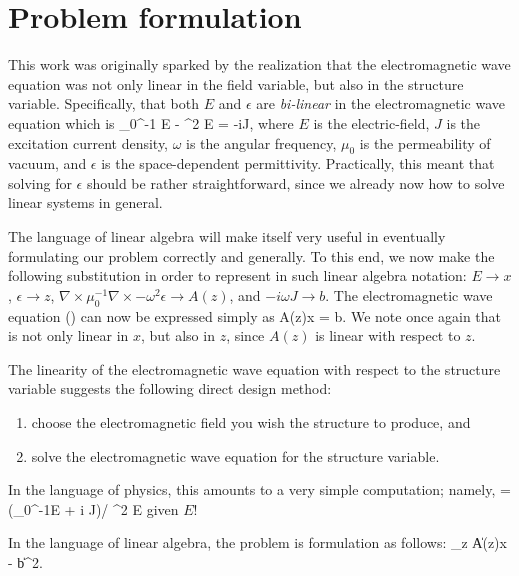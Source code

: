 \section{Problem formulation}
This work was originally sparked by the realization that 
    the electromagnetic wave equation was not only linear in the field variable,
    but also in the structure variable.
Specifically, that both $E$ and $\epsilon$ are \emph{bi-linear} in
    the electromagnetic wave equation which is
    \BE \nabla \times \mu_0^{-1} \nabla \times E - \omega^2 \epsilon E = 
        -i\omega J, \label{p1:wave} \EE
    where
    \BI $E$ is the electric-field,
    \I  $J$ is the excitation current density,
    \I  $\omega$ is the angular frequency,
    \I  $\mu_0$ is the permeability of vacuum, and
    \I  $\epsilon$ is the space-dependent permittivity. \EI
Practically, this meant that solving for $\epsilon$ should be rather straightforward,
    since we already now how to solve linear systems in general.

The language of linear algebra will make itself very useful
    in eventually formulating our problem correctly and generally.
To this end, we now make the following substitution in order to represent 
    in such linear algebra notation:
    \BI $E \to x$, 
    \I  $\epsilon \to z$,
    \I  $\nabla\times\mu_0^{-1}\nabla\times - \omega^2 \epsilon \to A(z)$, and
    \I  $-i\omega J \to b$. \EI
The electromagnetic wave equation () can now be expressed simply as
    \BE A(z)x = b. \label{p1:axb} \EE
We note once again that  is not only linear in $x$, but also in $z$, 
    since $A(z)$ is linear with respect to $z$.

The linearity of the electromagnetic wave equation with respect to
    the structure variable suggests the following direct design method:
    \begin{enumerate}
    \item choose the electromagnetic field you wish the structure to produce, and
    \item solve the electromagnetic wave equation for the structure variable. 
    \end{enumerate}

In the language of physics, this amounts to a very simple computation;
    namely,
    \BE \epsilon = (\nabla\times\mu_0^{-1}\nabla\times E + 
        i \omega J)/ \omega^2 E \EE
    given $E$! 

In the language of linear algebra, the problem is formulation as follows:
    \BE \minimize_z \|A(z)x - b\|^2. \label{p1:problem}\EE
    
